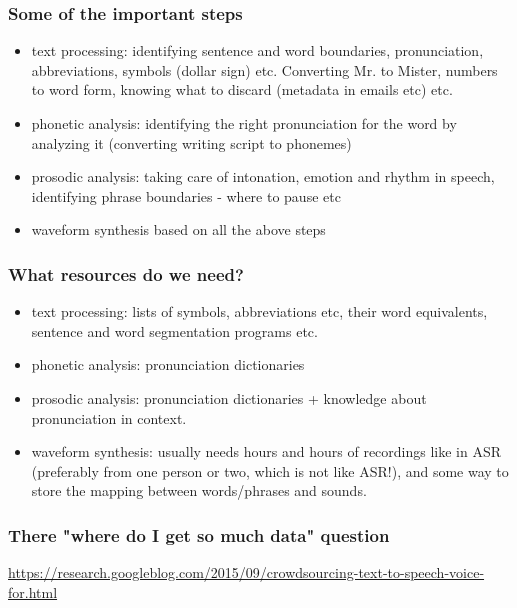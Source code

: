 \documentclass{beamer}
\begin{document}
\begin{frame}
\frametitle{Some of the important steps}
\begin{itemize}
\item text processing: identifying sentence and word boundaries, pronunciation, abbreviations, symbols (dollar sign) etc. Converting Mr. to Mister, numbers to word form, knowing what to discard (metadata in emails etc) etc. \pause 
\item phonetic analysis: identifying the right pronunciation for the word by analyzing it (converting writing script to phonemes) \pause
\item prosodic analysis: taking care of intonation, emotion and rhythm in speech, identifying phrase boundaries - where to pause etc \pause
\item waveform synthesis based on all the above steps
\end{itemize}
\end{frame}

\begin{frame}
\frametitle{What resources do we need?}
\begin{itemize}
\item text processing: lists of symbols, abbreviations etc, their  word equivalents, sentence and word segmentation programs etc.
\item phonetic analysis: pronunciation dictionaries
\item prosodic analysis: pronunciation dictionaries + knowledge about pronunciation in context.
\item waveform synthesis: usually needs hours and hours of recordings like in ASR (preferably from one person or two, which is not like ASR!), and some way to store the mapping between words/phrases and sounds.
\end{itemize}
\end{frame}

\begin{frame}
\frametitle{There "where do I get so much data" question}
\url{https://research.googleblog.com/2015/09/crowdsourcing-text-to-speech-voice-for.html}
\end{frame}
\end{document}
